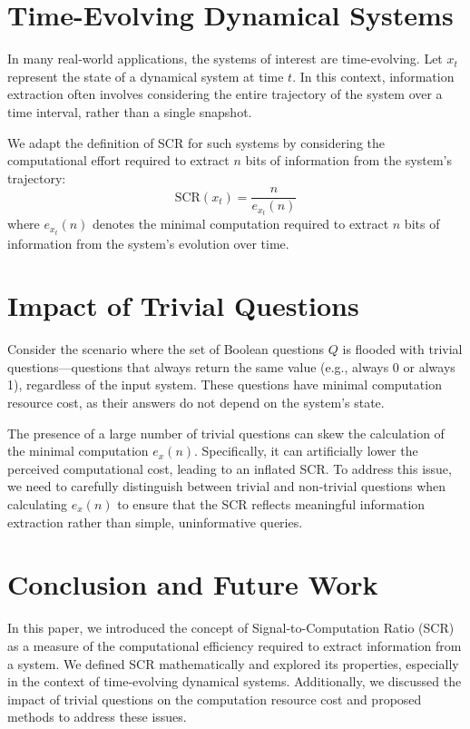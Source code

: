 \documentclass[11pt,a4paper]{article}
\theoremstyle{definition}
\theoremstyle{remark}
\numberwithin{equation}{section}
\begin{document}
\section{Time-Evolving Dynamical Systems}
In many real-world applications, the systems of interest are time-evolving. Let \(x_t\) represent the state of a dynamical system at time \(t\). In this context, information extraction often involves considering the entire trajectory of the system over a time interval, rather than a single snapshot.

We adapt the definition of SCR for such systems by considering the computational effort required to extract \(n\) bits of information from the system's trajectory:
\[
\text{SCR}(x_t) = \frac{n}{e_{x_t}(n)}
\]
where \(e_{x_t}(n)\) denotes the minimal computation required to extract \(n\) bits of information from the system's evolution over time.

\section{Impact of Trivial Questions}
Consider the scenario where the set of Boolean questions \(Q\) is flooded with trivial questions—questions that always return the same value (e.g., always 0 or always 1), regardless of the input system. These questions have minimal computation resource cost, as their answers do not depend on the system's state.

The presence of a large number of trivial questions can skew the calculation of the minimal computation \(e_x(n)\). Specifically, it can artificially lower the perceived computational cost, leading to an inflated SCR. To address this issue, we need to carefully distinguish between trivial and non-trivial questions when calculating \(e_x(n)\) to ensure that the SCR reflects meaningful information extraction rather than simple, uninformative queries.

\section{Conclusion and Future Work}
In this paper, we introduced the concept of Signal-to-Computation Ratio (SCR) as a measure of the computational efficiency required to extract information from a system. We defined SCR mathematically and explored its properties, especially in the context of time-evolving dynamical systems. Additionally, we discussed the impact of trivial questions on the computation resource cost and proposed methods to address these issues.
\end{document}
